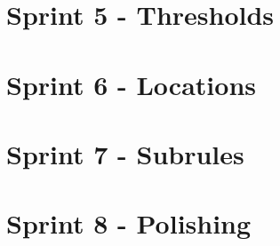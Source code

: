 \section{Sprint 5 - Thresholds}
\label{appendix:slides_5}


\section{Sprint 6 - Locations}
\label{appendix:slides_6}


\section{Sprint 7 - Subrules}
\label{appendix:slides_7}


\section{Sprint 8 - Polishing}
\label{appendix:slides_8}


